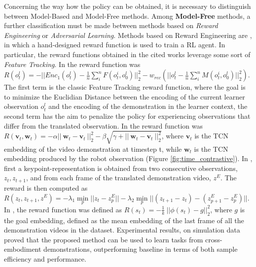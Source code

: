 Concerning the way how the policy can be obtained, it is necessary to distinguish between Model-Based and Model-Free methods. 
\newline Among \textbf{Model-Free} methods, a further classification must be made between methods based on \textit{Reward Engineering} or \textit{Adversarial Learning}.
\newline Methods based on Reward Engineering are \cite{sermanet2018time_contrastive,xiong2021learning_by_watching,zakka2022xirl}, in which a hand-designed reward function is used to train a RL agent. In particular, the reward functions obtained in the cited works leverage some sort of \textit{Feature Tracking}. In \cite{sermanet2018time_contrastive} the reward function was $R(o^{l}_{t}) = -||Enc_{1}(o^{l}_{t}) - \frac{1}{n} \sum_{i}^{n}F(o_{t}^{i},o_{0}^{l})||^{2}_{2} - w_{rec} (||o^{l}_{t} - \frac{1}{n} \sum_{i}^{n}M(o_{t}^{i},o_{0}^{l})||^{2}_{2})$. The first term is the classic Feature Tracking reward function, where the goal is to minimize the Euclidian Distance between the encoding of the current learner observation $o^{l}_{t}$ and the encoding of the demonstration in the learner context, the second term has the aim to penalize the policy for experiencing observations that differ from the translated observation.
In \cite{sermanet2018time_contrastive} the reward function was $R(\textbf{v}_{t}, \textbf{w}_{t}) = - \alpha || \ \textbf{w}_{t} - \textbf{v}_{t} \ ||^{2}_{2} - \beta \sqrt{\gamma + || \ \textbf{w}_{t} - \textbf{v}_{t} \ ||^{2}_{2}}$, where $\textbf{v}_{t}$ is the TCN embedding of the video demonstration at timestep t, while $\textbf{w}_{t}$ is the TCN embedding produced by the robot observation (Figure \ref{fig:time_contrastive}).
In \cite{xiong2021learning_by_watching}, first a keypoint-representation is obtained from two consecutive observations, $z_{t}, z_{t+1}$, and from each frame of the translated demonstration video, $z^{E}$. The reward is then computed as $R(z_{t},z_{t+1},z^{E}) = - \lambda_{1} \underset{p}{\min} ||z_{t}-z^{E}_{p}|| - \lambda_{2} \underset{p}{\min} ||(z_{t+1}-z_{t}) - (z^{E}_{p+1}-z^{E}_{p})||$. %
In \cite{zakka2022xirl}, the reward function was defined as $R(s_{t}) = -\frac{1}{k} \ || \phi(s_{t}) - g||^{2}_{2}$, where $g$ is the goal embedding, defined as the mean embedding of the last frame of all the demonstration videos in the dataset. Experimental results, on simulation data proved that the proposed method can be used to learn tasks from cross-embodiment demonstrations, outperforming baseline \cite{sermanet2018time_contrastive} in terms of both sample efficiency and performance.%

